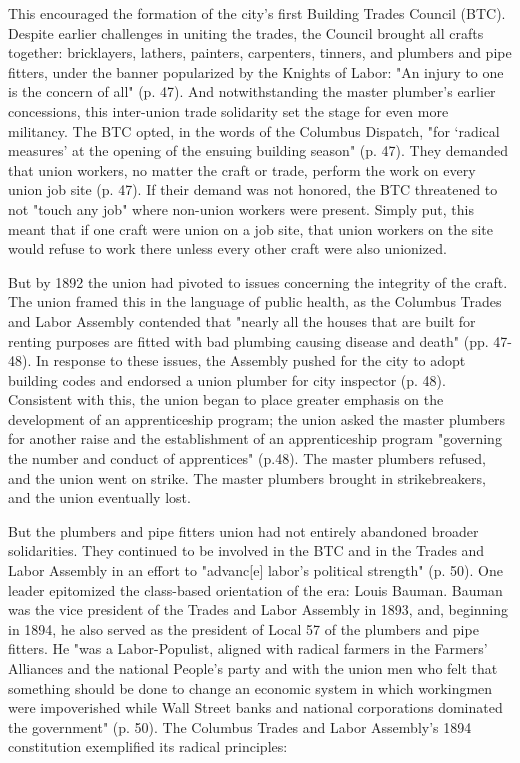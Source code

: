 \documentclass[12pt]{article}
\begin{document}
This encouraged the formation of the city’s first Building Trades Council (BTC). Despite earlier challenges in uniting the trades, the Council brought all crafts together: bricklayers, lathers, painters, carpenters, tinners, and plumbers and pipe fitters, under the banner popularized by the Knights of Labor: "An injury to one is the concern of all" (p. 47). And notwithstanding the master plumber’s earlier concessions, this inter-union trade solidarity set the stage for even more militancy. The BTC opted, in the words of the Columbus Dispatch, "for ‘radical measures’ at the opening of the ensuing building season" (p. 47). They demanded that union workers, no matter the craft or trade, perform the work on every union job site (p. 47). If their demand was not honored, the BTC threatened to not "touch any job" where non-union workers were present. Simply put, this meant that if one craft were union on a job site, that union workers on the site would refuse to work there unless every other craft were also unionized.

But by 1892 the union had pivoted to issues concerning the integrity of the craft. The union framed this in the language of public health, as the Columbus Trades and Labor Assembly contended that "nearly all the houses that are built for renting purposes are fitted with bad plumbing causing disease and death" (pp. 47-48). In response to these issues, the Assembly pushed for the city to adopt building codes and endorsed a union plumber for city inspector (p. 48). Consistent with this, the union began to place greater emphasis on the development of an apprenticeship program; the union asked the master plumbers for another raise and the establishment of an apprenticeship program "governing the number and conduct of apprentices" (p.48). The master plumbers refused, and the union went on strike. The master plumbers brought in strikebreakers, and the union eventually lost.

But the plumbers and pipe fitters union had not entirely abandoned broader solidarities. They continued to be involved in the BTC and in the Trades and Labor Assembly in an effort to "advanc[e] labor’s political strength" (p. 50). One leader epitomized the class-based orientation of the era: Louis Bauman. Bauman was the vice president of the Trades and Labor Assembly in 1893, and, beginning in 1894, he also served as the president of Local 57 of the plumbers and pipe fitters. He "was a Labor-Populist, aligned with radical farmers in the Farmers’ Alliances and the national People’s party and with the union men who felt that something should be done to change an economic system in which workingmen were impoverished while Wall Street banks and national corporations dominated the government" (p. 50). The Columbus Trades and Labor Assembly’s 1894 constitution exemplified its radical principles:
\end{document}
